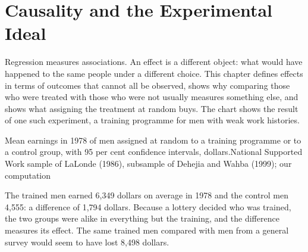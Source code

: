 \chapter{Causality and the Experimental Ideal}\label{ch:b2:causality-and-experiments}

Regression measures associations. An effect is a different object: what would have happened to the same people under a
different choice. This chapter defines effects in terms of outcomes that cannot all be observed, shows why comparing those
who were treated with those who were not usually measures something else, and shows what assigning the treatment at
random buys. The chart shows the result of one such experiment, a training programme for men with weak work histories.

\begin{openingchart}{Mean earnings in 1978 of men assigned at random to a training programme or to a control group, with
  95 per cent confidence intervals, dollars.}{National Supported Work sample of LaLonde (1986), subsample of Dehejia and
  Wahba (1999); our computation}
\end{openingchart}

The trained men earned 6,349 dollars on average in 1978 and the control men 4,555: a difference of 1,794 dollars. Because
a lottery decided who was trained, the two groups were alike in everything but the training, and the difference measures
its effect. The same trained men compared with men from a general survey would seem to have lost 8,498 dollars.

